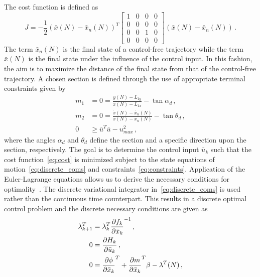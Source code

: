 \documentclass[letterpaper, paper,11pt]{AAS}		%
\begin{document}
The cost function is defined as
\begin{equation}
	J = -\frac{1}{2} \left( \bar{x}(N) - \bar{x}_{n}(N)\right)^T 
	\left[
	\begin{array}{cccc}
		1 & 0& 0& 0 \\
		 0& 0& 0& 0\\
		 0 & 0 & 1 &0\\
		 0 & 0& 0& 0
	\end{array}
	\right]
	\left( \bar{x}(N) - \bar{x}_{n}(N)\right) \, .
	\label{eq:cost}
\end{equation}
The term \( \bar{x}_n(N) \) is the final state of a control-free trajectory while the term \( \bar{x}(N) \) is the final state under the influence of the control input.
In this fashion, the aim is to maximize the distance of the final state from that of the control-free trajectory. 
A chosen \Poincare section is defined through the use of appropriate terminal constraints given by
\begin{subequations}
\begin{align}
    m_1 &= 0 = \frac{y(N) - L_{1y}}{x(N) - L_{1x}} - \tan{\alpha_d} \, , \\ 
    m_2&= 0 = \frac{\dot{x}(N) - \dot{x_n}(N) }{x(N) -x_n(N) } - \tan{\theta_d} \, , \\
	 0 &\geq\bar{u}^T \bar{u} - u_{max}^2 \, ,
\end{align}
    \label{eq:constraints}
\end{subequations}
where the angles \( \alpha_d\) and \( \theta_d\) define the \Poincare section and a specific direction upon the section, respectively. 
The goal is to determine the control input \( \bar{u}_k\) such that the cost function~\cref{eq:cost} is minimized subject to the state equations of motion~\cref{eq:discrete_eoms} and constraints~\cref{eq:constraints}.
Application of the Euler-Lagrange equations allows us to derive the necessary conditions for optimality~\cite{bryson1975}.
The discrete variational integrator in~\cref{eq:discrete_eoms} is used rather than the continuous time counterpart. 
This results in a discrete optimal control problem and the discrete necessary conditions are given as
\begin{subequations}\label{eq:necc_cond}
\begin{align}
	\lambda_{k+1}^T &= \lambda_k^T  \frac{\partial f_k}{\partial \bar{x}_k}^{-1} \, , \\
	0 &=  \frac{\partial H_k}{\partial \bar{u}_k} \, ,\\
	0 &= \frac{\partial \phi}{\partial \bar{x}_k}^T + \frac{\partial m}{\partial \bar{x}_k}^T\beta  - \lambda^T(N) \, ,  
\end{align}
\end{subequations}
\end{document}
